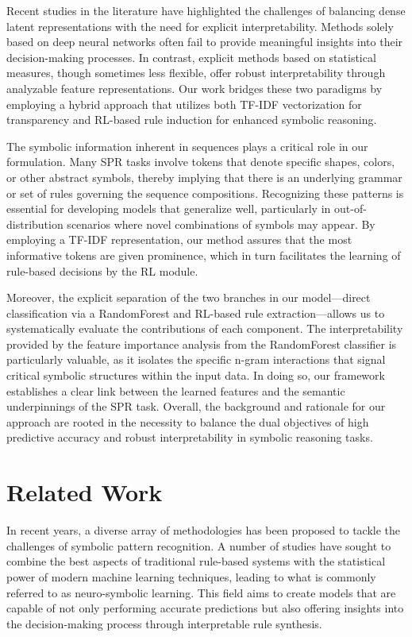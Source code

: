 \documentclass{article}
\begin{document}
Recent studies in the literature have highlighted the challenges of balancing dense latent representations with the need for explicit interpretability. Methods solely based on deep neural networks often fail to provide meaningful insights into their decision-making processes. In contrast, explicit methods based on statistical measures, though sometimes less flexible, offer robust interpretability through analyzable feature representations. Our work bridges these two paradigms by employing a hybrid approach that utilizes both TF-IDF vectorization for transparency and RL-based rule induction for enhanced symbolic reasoning.

The symbolic information inherent in sequences plays a critical role in our formulation. Many SPR tasks involve tokens that denote specific shapes, colors, or other abstract symbols, thereby implying that there is an underlying grammar or set of rules governing the sequence compositions. Recognizing these patterns is essential for developing models that generalize well, particularly in out-of-distribution scenarios where novel combinations of symbols may appear. By employing a TF-IDF representation, our method assures that the most informative tokens are given prominence, which in turn facilitates the learning of rule-based decisions by the RL module.

Moreover, the explicit separation of the two branches in our model—direct classification via a RandomForest and RL-based rule extraction—allows us to systematically evaluate the contributions of each component. The interpretability provided by the feature importance analysis from the RandomForest classifier is particularly valuable, as it isolates the specific n-gram interactions that signal critical symbolic structures within the input data. In doing so, our framework establishes a clear link between the learned features and the semantic underpinnings of the SPR task. Overall, the background and rationale for our approach are rooted in the necessity to balance the dual objectives of high predictive accuracy and robust interpretability in symbolic reasoning tasks.

\section{Related Work}
In recent years, a diverse array of methodologies has been proposed to tackle the challenges of symbolic pattern recognition. A number of studies have sought to combine the best aspects of traditional rule-based systems with the statistical power of modern machine learning techniques, leading to what is commonly referred to as neuro-symbolic learning. This field aims to create models that are capable of not only performing accurate predictions but also offering insights into the decision-making process through interpretable rule synthesis.
\end{document}
